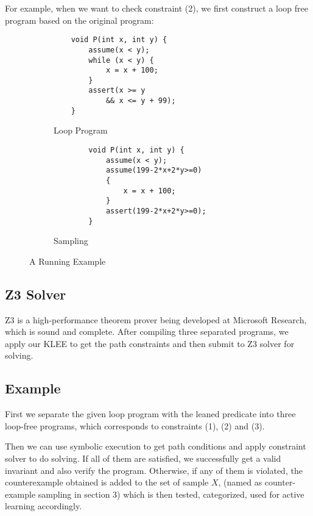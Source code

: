 For example, when we want to check constraint (2), 
we first construct a loop free program based on the original program:
\begin{figure}[t]
\begin{subfigure}{0.245\textwidth}
    \centering
    \vspace{1.5cm}
    {\scriptsize\begin{verbatim}
    void P(int x, int y) {
        assume(x < y);
        while (x < y) {
            x = x + 100;
        }
        assert(x >= y
            && x <= y + 99);
    }
    \end{verbatim}}
    \vspace{0.5cm}
    \caption{Loop Program}
    \label{fig:running:example:program}
\end{subfigure}%
\begin{subfigure}{.245\textwidth}
      \centering
      \vspace{1.5cm}
        {\scriptsize\begin{verbatim}
        void P(int x, int y) {
            assume(x < y);
            assume(199-2*x+2*y>=0) 
            {
                x = x + 100;
            }
            assert(199-2*x+2*y>=0);
        }
    \end{verbatim}}
    \vspace{0.5cm}
      \caption{Sampling}
      \label{fig:running:example:sampling}
\end{subfigure}
\caption{A Running Example}
\label{fig:running:example}
\end{figure}




\subsection{Z3 Solver}
Z3 is a high-performance theorem prover being developed at Microsoft Research, which is sound and complete.
After compiling three separated programs, we apply our KLEE to get the path constraints and then submit to Z3 solver for solving.

\subsection{Example}
First we separate the given loop program with the leaned predicate into three loop-free programs,
which corresponds to constraints (1), (2) and (3). 

Then we can use symbolic execution to get path conditions and apply constraint solver to do solving.
If all of them are satisfied, we successfully get a valid invariant and also verify the program. 
Otherwise, if any of them is violated, the counterexample obtained is added to the set of sample $X$, (named as counter-example sampling in section 3)
which is then tested, categorized, used for active learning accordingly.




